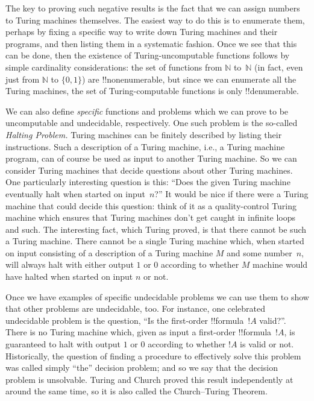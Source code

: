 \documentclass[10pt,a4paper]{article}
\theoremstyle{plain}
\theoremstyle{definition}
\theoremstyle{remark}
\providecommand{\Nat}{\ensuremath{\mathbb{N}}}
\begin{document}
The key to proving such negative results is the fact that we can
assign numbers to Turing machines themselves.  The easiest way to do
this is to enumerate them, perhaps by fixing a specific way to write
down Turing machines and their programs, and then listing them in a
systematic fashion.  Once we see that this can be done, then the
existence of Turing-uncomputable functions follows by simple
cardinality considerations: the set of functions from $\Nat$ to~$\Nat$ (in
fact, even just from $\Nat$ to $\{0, 1\}$) are !!{nonenumerable}, but
since we can enumerate all the Turing machines, the set of Turing-computable
functions is only !!{denumerable}.

We can also define \emph{specific} functions and problems which we can
prove to be uncomputable and undecidable, respectively.  One such
problem is the so-called \emph{Halting Problem.} Turing machines can
be finitely described by listing their instructions.  Such a
description of a Turing machine, i.e., a Turing machine program, can
of course be used as input to another Turing machine.  So we can
consider Turing machines that decide questions about other Turing
machines.  One particularly interesting question is this: ``Does the
given Turing machine eventually halt when started on input~$n$?''  It
would be nice if there were a Turing machine that could decide this
question: think of it as a quality-control Turing machine which
ensures that Turing machines don't get caught in infinite loops and
such.  The interesting fact, which Turing proved, is that there cannot
be such a Turing machine. There cannot be a single Turing machine
which, when started on input consisting of a description of a Turing
machine $M$ and some number~$n$, will always halt with either output
$1$ or $0$ according to whether $M$ machine would have halted when
started on input $n$ or not.

Once we have examples of specific undecidable problems we can use them
to show that other problems are undecidable, too.  For instance, one
celebrated undecidable problem is the question, ``Is the first-order
!!{formula}~$!A$ valid?''.  There is no Turing machine which, given as
input a first-order !!{formula}~$!A$, is guaranteed to halt with
output $1$ or $0$ according to whether $!A$ is valid or not.
Historically, the question of finding a procedure to effectively solve
this problem was called simply ``the'' decision problem; and so we say
that the decision problem is unsolvable.  Turing and Church proved this
result independently at around the same time, so it is also called the
Church--Turing Theorem.
\end{document}
